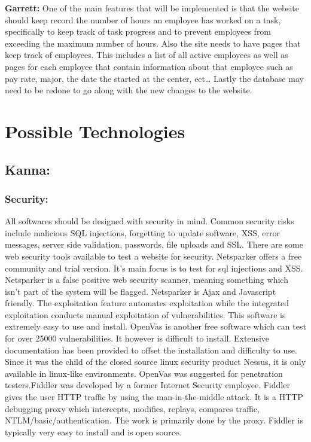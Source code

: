 \documentclass[letterpaper,10pt,titlepage,journal,compsoc,draftclsnofoot,onecolumn]{IEEEtran}
\newcommand\tab[1][1cm]{\hspace*{#1}}
\begin{document}
{\textbf{Garrett:} \newline
\tab One of the main features that will be implemented is that the website should keep record the number of hours an employee has worked on a task, specifically to keep track of task progress and to prevent employees from exceeding the maximum number of hours. Also the site needs to have pages that keep track of employees. This includes a list of all active employees as well as pages for each employee that contain information about that employee such as pay rate, major, the date the started at the center, ect… Lastly the database may need to be redone to go along with the new changes to the website. }

\section{Possible Technologies}

\subsection{Kanna:} 
\subsubsection{Security:}
\tab All softwares should be designed with security in mind. Common security risks include malicious SQL injections, forgetting to update software, XSS, error messages, server side validation, passwords, file uploads and SSL. There are some web security tools available to test a website for security. \newline\newline\tab Netsparker offers a free community and trial version. It’s main focus is to test for sql injections and XSS. Netsparker is a false positive web security scanner, meaning something which isn’t part of the system will be flagged. Netsparker is Ajax and Javascript friendly. The exploitation feature automates exploitation while the integrated exploitation conducts manual exploitation of vulnerabilities. This software is extremely easy to use and install. \newline \newline \tab OpenVas is another free software which can test for over 25000 vulnerabilities. It however is difficult to install. Extensive documentation has been provided to offset the installation and difficulty to use. Since it was the child of the closed source linux security product Nessus, it is only available in linux-like environments. OpenVas was suggested for penetration testers.\newline\newline\tab Fiddler was developed by a former Internet Security employee. Fiddler gives the user HTTP traffic by using the man-in-the-middle attack. It is a HTTP debugging proxy which intercepts, modifies, replays, compares traffic, NTLM/basic/authentication. The work is primarily done by the proxy. Fiddler is typically very easy to install and is open source. \newline
\end{document}
